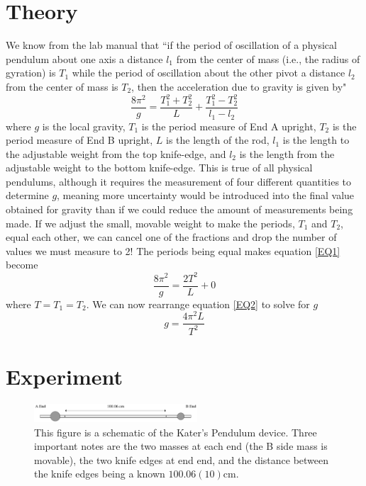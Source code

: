 \documentclass[aps,prl,10pt,twocolumn,floatfix]{revtex4-2}
\begin{document}
\section{Theory}\label{Theory}
We know from the lab manual that ``if the period of oscillation of a physical pendulum about one axis a distance $l_1$ from the center of mass (i.e., the radius of gyration) is $T_1$ while the period of oscillation about the other pivot a distance $l_2$ from the center of mass is $T_2$, then the acceleration due to gravity is given by"
\begin{equation}\label{EQ1}
\frac{8\pi^2}{g}=\frac{T_1^2+T_2^2}{L}+\frac{T_1^2-T_2^2}{l_1-l_2}
\end{equation}
where $g$ is the local gravity, $T_1$ is the period measure of End A upright, $T_2$ is the period measure of End B upright, $L$ is the length of the rod, $l_1$ is the length to the adjustable weight from the top knife-edge, and $l_2$ is the length from the adjustable weight to the bottom knife-edge\cite{Manual}. 
This is true of all physical pendulums, although it requires the measurement of four different quantities to determine $g$, meaning more uncertainty would be introduced into the final value obtained for gravity than if we could reduce the amount of measurements being made. 
If we adjust the small, movable weight to make the periods, $T_1$ and $T_2$, equal each other, we can cancel one of the fractions and drop the number of values we must measure to 2!
The periods being equal makes equation \ref{EQ1} become
\begin{equation}\label{EQ2}
\frac{8\pi^2}{g}=\frac{2T^2}{L}+0
\end{equation}
where $T=T_1=T_2$.
We can now rearrange equation \ref{EQ2} to solve for $g$
\begin{equation}\label{finalE}
g=\frac{4\pi^2L}{T^2}
\end{equation}

\section{Experiment}
\begin{figure}
\includegraphics[width=230px]{diagram.eps}
\caption{This figure is a schematic of the Kater's Pendulum device. Three important notes are the two masses at each end (the B side mass is movable), the two knife edges at end end, and the distance between the knife edges being a known $100.06(10)$cm.}
\label{pendulum}
\end{figure}
\end{document}
